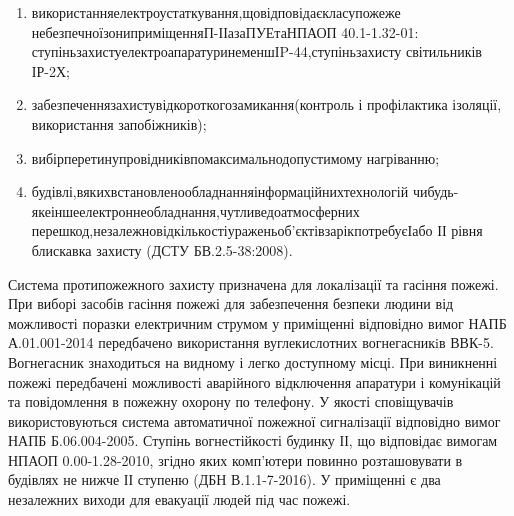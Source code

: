 \begin{enumerate}
	\item використання\hfill електроустаткування,\hfill що\hfill відповідає\hfill класу\hfill пожеже\newline \hspace*{-18mm} небезпечної\hfill зони\hfill приміщення\hfill П-ІІа\hfill за\hfill ПУЕ\hfill та\hfill НПАОП 40.1-1.32-01:\newline \hspace*{-18mm} ступінь\hfill захисту\hfill електроапаратури\hfill не\hfill менш\hfill ІP-44,\hfill ступінь\hfill захисту\newline \hspace*{-18mm} світильників ІР-2Х;
	\item забезпечення\hfill захисту\hfill від\hfill короткого\hfill замикання\hfill (контроль і\newline \hspace*{-18mm} профілактика ізоляції, використання запобіжників);
	\item вибір\hfill перетину\hfill провідників\hfill по\hfill максимально\hfill допустимому\newline \hspace*{-18mm} нагріванню;
	\item будівлі,\hfill в\hfill яких\hfill встановлено\hfill обладнання\hfill інформаційних\hfill технологій\newline \hspace*{-18mm} чи\hfill будь-яке\hfill інше\hfill електронне\hfill обладнання,\hfill чутливе\hfill до\hfill атмосферних\newline \hspace*{-18mm} перешкод,\hfill незалежно\hfill від\hfill кількості\hfill уражень\hfill об’єктів\hfill за\hfill рік\hfill потребує\hfill І\hfill або\newline \hspace*{-18mm} ІІ рівня блискавка захисту (ДСТУ БВ.2.5-38:2008).
\end{enumerate}

Система протипожежного захисту призначена для локалізації та гасіння пожежі. При виборі засобів гасіння пожежі для забезпечення безпеки людини від можливості поразки електричним струмом у приміщенні відповідно вимог НАПБ А.01.001-2014 передбачено використання вуглекислотних вогнегасникiв ВВК-5. Вогнегасник знаходиться на видному і легко доступному місці. При виникненні пожежі передбачені можливості аварійного відключення апаратури і комунікацій та повідомлення в пожежну охорону по телефону. У якості сповіщувачів використовуються система автоматичної пожежної сигналізації відповідно вимог НАПБ Б.06.004-2005. Ступінь вогнестійкості будинку ІІ, що відповідає вимогам НПАОП 0.00-1.28-2010, згідно яких комп’ютери повинно розташовувати в будівлях не нижче ІІ ступеню (ДБН В.1.1-7-2016). У приміщенні є два незалежних виходи для евакуації людей під час пожежі.

